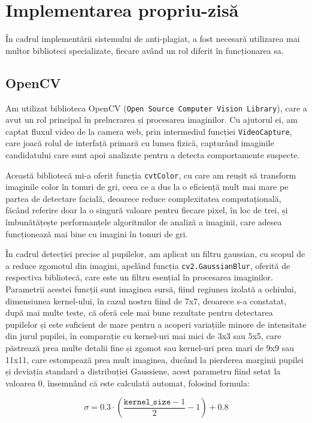\documentclass[12pt,a4paper]{article}
\begin{document}
\section{Implementarea propriu-zisă}

În cadrul implementării sistemului de anti-plagiat, a fost necesară utilizarea mai multor biblioteci specializate, fiecare având un rol diferit în funcționarea sa.

\subsection{OpenCV}
Am utilizat biblioteca OpenCV (\texttt{Open Source Computer Vision Library}),
care a avut un rol principal în prelucrarea și procesarea imaginilor. Cu
ajutorul ei, am captat fluxul video de la camera web, prin intermediul
funcției \texttt{VideoCapture}, care joacă rolul de interfață primară cu lumea
fizică, capturând imaginile candidatului care sunt apoi analizate pentru
a detecta comportamente suspecte.

Această bibliotecă mi-a oferit funcția \texttt{cvtColor}, cu care am reușit să
transform imaginile color în tonuri de gri, ceea ce a dus la o eficiență
mult mai mare pe partea de detectare facială, deoarece reduce
complexitatea computațională, făcând referire doar la o singură valoare
pentru fiecare pixel, în loc de trei, și îmbunătățește performanțele
algoritmilor de analiză a imaginii, care adesea funcționează mai bine cu
imagini în tonuri de gri.

În cadrul detecției precise al pupilelor, am aplicat un filtru gaussian,
cu scopul de a reduce zgomotul din imagini, apelând funcția
\texttt{cv2.GaussianBlur}, oferită de respectiva bibliotecă, care este un filtru
esențial în procesarea imaginilor. Parametrii acestei funcții sunt
imaginea sursă, fiind regiunea izolată a ochiului, dimensiunea
kernel-ului, în cazul nostru fiind de 7x7, deoarece s-a constatat, după
mai multe teste, că oferă cele mai bune rezultate pentru detectarea
pupilelor și este suficient de mare pentru a acoperi variațiile minore
de intensitate din jurul pupilei, în comparație cu kernel-uri mai mici
de 3x3 sau 5x5, care păstrează prea multe detalii fine și zgomot sau
kernel-uri prea mari de 9x9 sau 11x11, care estompează prea mult
imaginea, ducând la pierderea marginii pupilei și deviația standard a
distribuției Gaussiene, acest parametru fiind setat la valoarea 0,
însemnând că este calculată automat, folosind formula:

\begin{equation}
\sigma = 0.3 \cdot \left( \frac{\texttt{kernel\_size} - 1}{2} - 1 \right) + 0.8
\end{equation}
\end{document}
